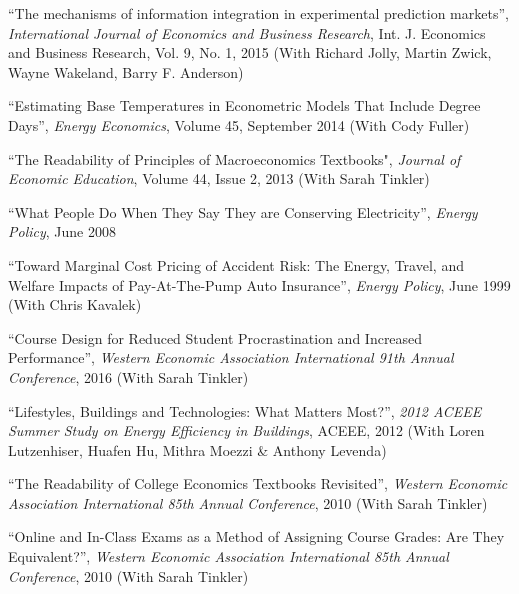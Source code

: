 \documentclass[Computer Science]{vita}
\begin{document}
\begin{vita}
\begin{Publications}
\begin{Papers in Refereed Journals}
    
\item ``The mechanisms of information integration in experimental prediction markets'',  \emph{International Journal of Economics and Business Research}, Int. J. Economics and Business Research, Vol. 9, No. 1, 2015 (With Richard Jolly, Martin Zwick, Wayne Wakeland, Barry F. Anderson)
      
    \item ``Estimating Base Temperatures in Econometric Models That Include Degree Days'',  \emph{Energy Economics}, Volume 45, September 2014 (With Cody Fuller)
    
    \item ``The Readability of Principles of Macroeconomics Textbooks", \emph{Journal of Economic Education}, Volume 44, Issue 2, 2013 (With Sarah Tinkler) 
    
    \item ``What People Do When They Say They are Conserving Electricity'', \emph{Energy Policy}, June 2008

    \item ``Toward Marginal Cost Pricing of Accident Risk: The Energy,
      Travel, and Welfare Impacts of Pay-At-The-Pump Auto Insurance'',
      \emph{Energy Policy}, June 1999 (With Chris Kavalek)

    \end{Papers in Refereed Journals}

    \begin{Papers at Refereed Conferences}
    
    \item ``Course Design for Reduced Student Procrastination and Increased Performance'', \emph{Western Economic Association International
        91th Annual Conference}, 2016 (With Sarah Tinkler)
        
    
\item ``Lifestyles, Buildings and Technologies: What Matters Most?'', \emph{2012 ACEEE Summer Study
        on Energy Efficiency in Buildings}, ACEEE, 2012 (With Loren Lutzenhiser, Huafen Hu, Mithra Moezzi \& Anthony Levenda)

    \item ``The Readability of College Economics Textbooks Revisited'', \emph{Western Economic Association International
        85th Annual Conference}, 2010 (With Sarah Tinkler)

    \item ``Online and In-Class Exams as a Method of Assigning Course Grades: 
Are They Equivalent?'', \emph{Western Economic Association International
        85th Annual Conference}, 2010 (With Sarah Tinkler)


\end{Papers at Refereed Conferences}
\end{Publications}
\end{vita}
\end{document}
